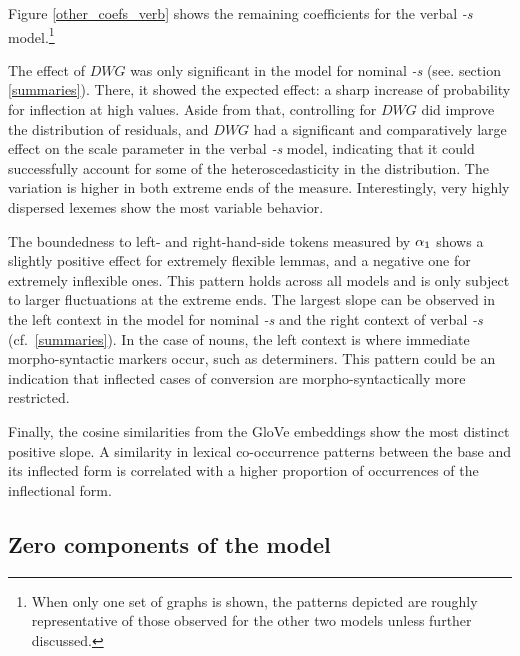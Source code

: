 \documentclass[
]{article}
\begin{document}
Figure \ref{other_coefs_verb} shows the remaining coefficients for the
verbal \emph{-s} model.\footnote{When only one set of graphs is shown,
  the patterns depicted are roughly representative of those observed for
  the other two models unless further discussed.}

The effect of \(DWG\) was only significant in the model for nominal
\emph{-s} (see. section \ref{summaries}). There, it showed the expected
effect: a sharp increase of probability for inflection at high values.
Aside from that, controlling for \(DWG\) did improve the distribution of
residuals, and \(DWG\) had a significant and comparatively large effect
on the scale parameter in the verbal \emph{-s} model, indicating that it
could successfully account for some of the heteroscedasticity in the
distribution. The variation is higher in both extreme ends of the
measure. Interestingly, very highly dispersed lexemes show the most
variable behavior.

The boundedness to left- and right-hand-side tokens measured by
\(\alpha\textsubscript{1}\) shows a slightly positive effect for
extremely flexible lemmas, and a negative one for extremely inflexible
ones. This pattern holds across all models and is only subject to larger
fluctuations at the extreme ends. The largest slope can be observed in
the left context in the model for nominal \emph{-s} and the right
context of verbal \emph{-s} (cf.~\ref{summaries}). In the case of nouns,
the left context is where immediate morpho-syntactic markers occur, such
as determiners. This pattern could be an indication that inflected cases
of conversion are morpho-syntactically more restricted.

Finally, the cosine similarities from the GloVe embeddings show the most
distinct positive slope. A similarity in lexical co-occurrence patterns
between the base and its inflected form is correlated with a higher
proportion of occurrences of the inflectional form.

\hypertarget{zero-components-of-the-model}{%
\subsection{Zero components of the
model}\label{zero-components-of-the-model}}
\end{document}
